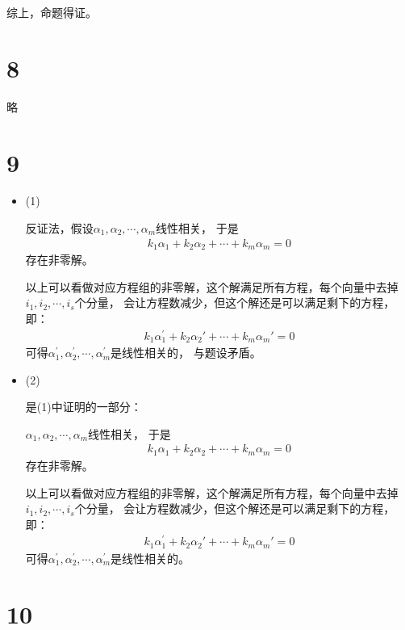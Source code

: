 \documentclass{article}
\begin{document}
综上，命题得证。

\section*{8}

略

\section*{9}

\begin{itemize}
  \item (1)

        反证法，假设$\alpha_1, \alpha_2, \cdots, \alpha_m$线性相关，
        于是
        \begin{align*}
          k_1 \alpha_1 + k_2 \alpha_2 + \cdots + k_m \alpha_m = 0
        \end{align*}
        存在非零解。

        以上可以看做对应方程组的非零解，这个解满足所有方程，每个向量中去掉$i_1, i_2 , \cdots, i_s$个分量，
        会让方程数减少，但这个解还是可以满足剩下的方程，即：
        \begin{align*}
          k_1 \alpha_1^\prime + k_2 \alpha_2\prime + \cdots + k_m \alpha_m\prime = 0
        \end{align*}
        可得$\alpha_1^\prime, \alpha_2^\prime, \cdots, \alpha_m^\prime$是线性相关的，
        与题设矛盾。

  \item (2)

        是(1)中证明的一部分：

        $\alpha_1, \alpha_2, \cdots, \alpha_m$线性相关，
        于是
        \begin{align*}
          k_1 \alpha_1 + k_2 \alpha_2 + \cdots + k_m \alpha_m = 0
        \end{align*}
        存在非零解。

        以上可以看做对应方程组的非零解，这个解满足所有方程，每个向量中去掉$i_1, i_2 , \cdots, i_s$个分量，
        会让方程数减少，但这个解还是可以满足剩下的方程，即：
        \begin{align*}
          k_1 \alpha_1^\prime + k_2 \alpha_2\prime + \cdots + k_m \alpha_m\prime = 0
        \end{align*}
        可得$\alpha_1^\prime, \alpha_2^\prime, \cdots, \alpha_m^\prime$是线性相关的。
\end{itemize}

\section*{10}
\end{document}
